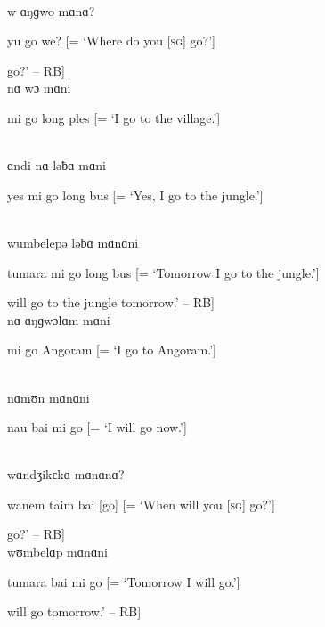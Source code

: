 \\

\noindent w ɑŋɡwo mɑnɑ?

\noindent yu go we? [= ‘Where do you [\textsc{sg}] go?’]

\noindent [‘Where will you [\textsc{sg}] go?’ -- RB]\\

\noindent nɑ wɔ mɑni

\noindent mi go long ples [= ‘I go to the village.’]

\\

\noindent ɑndi nɑ ləƀɑ mɑni


\noindent yes mi go long bus [= ‘Yes, I go to the jungle.’]

\\

\noindent wumbelepə ləƀɑ mɑnɑni

\noindent tumara mi go long bus [= ‘Tomorrow I go to the jungle.’]

\noindent [‘[I] will go to the jungle tomorrow.’ -- RB]\\

\noindent nɑ ɑŋɡwɔlɑm mɑni

\noindent mi go Angoram [= ‘I go to Angoram.’]

\\

\noindent nɑmʊn mɑnɑni

\noindent nau bai mi go [= ‘I will go now.’]

\\

\noindent wɑndʒikɛkɑ mɑnɑnɑ?

\noindent wanem taim bai [go] [= ‘When will you [\textsc{sg}] go?’]

\noindent [‘When will you [\textsc{sg}] go?’ -- RB]\\

\noindent wʊmbelɑp mɑnɑni

\noindent tumara bai mi go [= ‘Tomorrow I will go.’]

\noindent [‘[I] will go tomorrow.’ -- RB]\\

